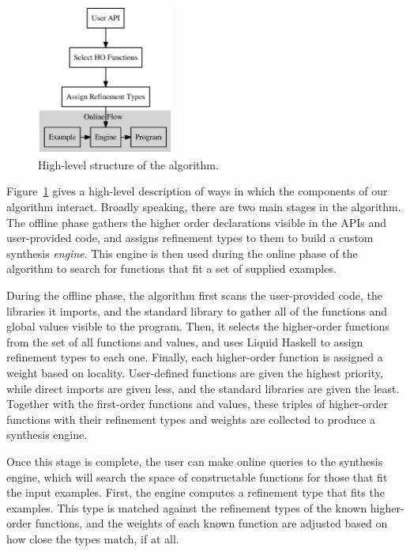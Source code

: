 

\begin{figure}[t]
  \centering
  \includegraphics[width=0.4\textwidth]{algo}
  \caption{High-level structure of the algorithm.}
  \label{fig:high_level_overview}
\end{figure}

Figure~\ref{fig:high_level_overview} gives a high-level description of ways in which the components of our algorithm interact. Broadly speaking, there are two main stages in the algorithm. The offline phase gathers the higher order declarations visible in the APIs and user-provided code, and assigns refinement types to them to build a custom synthesis \textit{engine}. This engine is then used during the online phase of the algorithm to search for functions that fit a set of supplied examples.

During the offline phase, the algorithm first scans the user-provided code, the libraries it imports, and the standard library to gather all of the functions and global values visible to the program. Then, it selects the higher-order functions from the set of all functions and values, and uses Liquid Haskell \cite{liquidhaskell} to assign refinement types to each one. Finally, each higher-order function is assigned a weight based on locality. User-defined functions are given the highest priority, while direct imports are given less, and the standard libraries are given the least. Together with the first-order functions and values, these triples of higher-order functions with their refinement types and weights are collected to produce a synthesis engine.

Once this stage is complete, the user can make online queries to the synthesis engine, which will search the space of constructable functions for those that fit the input examples. First, the engine computes a refinement type that fits the examples. This type is matched against the refinement types of the known higher-order functions, and the weights of each known function are adjusted based on how close the types match, if at all.

